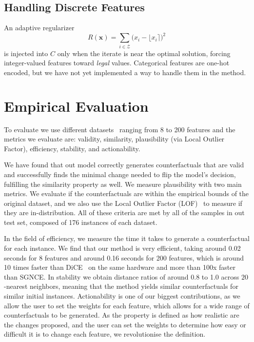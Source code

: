 \documentclass[12pt]{extarticle}
\numberwithin{equation}{section}
\begin{document}
\subsection*{Handling Discrete Features}
An adaptive regularizer 
\[
R(\mathbf{x})=\sum_{i\in \mathcal{Z}}\bigl(x_i-\lfloor x_i\rceil\bigr)^2
\]
is injected into $C$ only when the iterate is near the optimal solution, forcing integer-valued features toward \emph{legal} values. Categorical features are one-hot encoded, but we have not yet implemented a way to handle them in the method.

\section*{Empirical Evaluation}
To evaluate we use different datasets~\cite{kaggleLoan1,spambase,santander} ranging from 8 to 200 features and the metrics we evaluate are: validity, similarity, plausibility (via Local Outlier Factor), efficiency, stability, and actionability.

We have found that out model correctly generates counterfactuals that are valid and successfully finds the minimal change needed to flip the model's decision, fulfilling the similarity property as well. We measure plausibility with two main metrics. We evaluate if the counterfactuals are within the empirical bounds of the original dataset, and we also use the Local Outlier Factor (LOF)~\cite{lof} to measure  if they are in-distribution. All of these criteria are met by all of the samples in out test set, composed of 176 instances of each dataset. 

In the field of efficiency, we measure the time it takes to generate a counterfactual for each instance. We find that our method is very efficient, taking around 0.02 seconds for 8 features and around 0.16 seconds for 200 features, which is around 10 times faster than DiCE~\cite{dice} on the same hardware and more than 100x faster than SGNCE. In stability we obtain distance ratios of around 0.8 to 1.0 across $20$-nearest neighbors, meaning that the method yields similar counterfactuals for similar initial instances. Actionability is one of our biggest contributions, as we allow the user to set the weights for each feature, which allows for a wide range of counterfactuals to be generated. As the property is defined as how realistic are the changes proposed, and the user can set the weights to determine how easy or difficult it is to change each feature, we revolutionise the definition.
\end{document}
